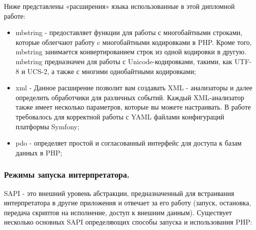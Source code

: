 Ниже представлены «расширения» языка использованные в этой дипломной работе:
\begin{itemize}
  \item mbstring - предоставляет функции для работы с многобайтными строками, которые облегчают работу c многобайтными кодировками в PHP. Кроме того, mbstring занимается конвертированием строк из одной кодировки в другую. mbstring предназначен для работы с Unicode-кодировками, такими, как UTF-8 и UCS-2, а также с многими однобайтными кодировками;
  \item xml - Данное расширение позволит вам создавать XML - анализаторы и далее определить обработчики для различных событий. Каждый XML-анализатор также имеет несколько параметров, которые вы можете настраивать. В работе требовалось для корректной работы с YAML файлами конфигураций платформы Symfony;
  \item pdo - определяет простой и согласованный интерфейс для доступа к базам данных в PHP;
\end{itemize}

\subsubsection{Режимы запуска интерпретатора. }
\label{sub:practice:extebtions_php}

SAPI - это внешний уровень абстракции, предназначенный для встраивания интерпретатора в другие приложения и отвечает за его работу (запуск, остановка, передача скриптов на исполнение, доступ к внешним данным). Существует несколько основных SAPI определяющих способы запуска и использования PHP:

